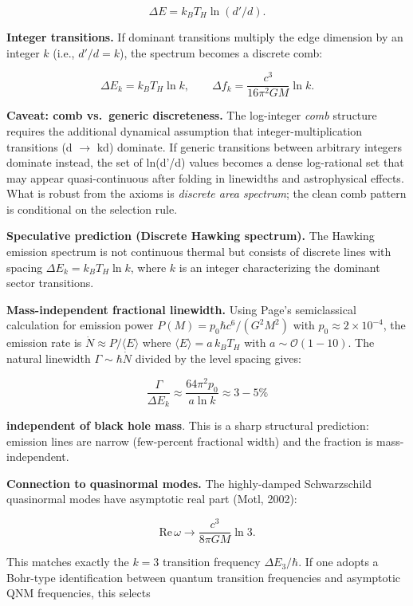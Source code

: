 \documentclass[11pt,a4paper]{article}
\theoremstyle{remark}
\begin{document}
\[
\Delta E = k_B T_H \ln(d'/d).
\]

\textbf{Integer transitions.} If dominant transitions multiply the edge dimension
by an integer \(k\) (i.e., \(d'/d = k\)), the spectrum becomes a discrete comb:

\[
\Delta E_k = k_B T_H \ln k, \qquad
\Delta f_k = \frac{c^3}{16\pi^2 G M} \ln k.
\]

\textbf{Caveat: comb vs.~generic discreteness.} The log-integer \emph{comb} structure
requires the additional dynamical assumption that integer-multiplication
transitions (d \ensuremath{\to} kd) dominate. If generic transitions between arbitrary
integers dominate instead, the set of ln(d'/d) values becomes a dense
log-rational set that may appear quasi-continuous after folding in linewidths
and astrophysical effects. What is robust from the axioms is \emph{discrete area
spectrum}; the clean comb pattern is conditional on the selection rule.

\textbf{Speculative prediction (Discrete Hawking spectrum).} The Hawking emission
spectrum is not continuous thermal but consists of discrete lines with
spacing \(\Delta E_k = k_B T_H \ln k\), where \(k\) is an integer characterizing
the dominant sector transitions.

\textbf{Mass-independent fractional linewidth.} Using Page's semiclassical
calculation for emission power \(P(M) = p_0 \hbar c^6 / (G^2 M^2)\) with
\(p_0 \approx 2 \times 10^{-4}\), the emission rate is \(\dot{N} \approx P /
\langle E \rangle\) where \(\langle E \rangle = a \, k_B T_H\) with \(a \sim
\mathcal{O}(1-10)\). The natural linewidth \(\Gamma \sim \hbar \dot{N}\)
divided by the level spacing gives:

\[
\frac{\Gamma}{\Delta E_k} \approx \frac{64\pi^2 p_0}{a \ln k} \approx 3-5\%
\]

\textbf{independent of black hole mass}. This is a sharp structural prediction:
emission lines are narrow (few-percent fractional width) and the fraction
is mass-independent.

\textbf{Connection to quasinormal modes.} The highly-damped
Schwarzschild quasinormal modes have asymptotic real part (Motl, 2002):

\[
\mathrm{Re}\,\omega \to \frac{c^3}{8\pi G M} \ln 3.
\]

This matches exactly the \(k = 3\) transition frequency \(\Delta E_3 / \hbar\).
If one adopts a Bohr-type identification between quantum transition
frequencies and asymptotic QNM frequencies, this selects
\end{document}
